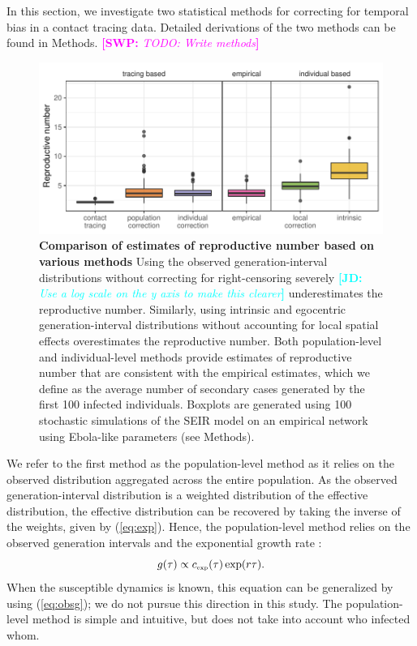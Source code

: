 \documentclass[12pt]{article}
\newcommand{\eref}[1]{(\ref{eq:#1})}
\newcommand{\tsub}[2]{#1_{{\textrm{\tiny #2}}}}
\newcommand{\comment}[3]{\textcolor{#1}{\textbf{[#2: }\textsl{#3}\textbf{]}}}
\newcommand{\jd}[1]{\comment{cyan}{JD}{#1}}
\newcommand{\swp}[1]{\comment{magenta}{SWP}{#1}}
\begin{document}
In this section, we investigate two statistical methods for correcting for temporal bias in a contact tracing data.
Detailed derivations of the two methods can be found in Methods.
\swp{TODO: Write methods}


\begin{figure}[ht]
\includegraphics[width=\textwidth]{../fig/cmp_reproductive.pdf}
\caption{\textbf{Comparison of estimates of reproductive number based on various methods}
Using the observed generation-interval distributions without correcting for right-censoring severely \jd{Use a log scale on the y axis to make this clearer} underestimates the reproductive number.
Similarly, using intrinsic and egocentric generation-interval distributions without accounting for local spatial effects overestimates the reproductive number.
Both population-level and individual-level methods provide estimates of reproductive number that are consistent with the empirical estimates, which we define as the average number of secondary cases generated by the first 100 infected individuals.
Boxplots are generated using 100 stochastic simulations of the SEIR model on an empirical network using Ebola-like parameters (see Methods).
}
\label{fig:cmp}
\end{figure}

We refer to the first method as the population-level method as it relies on the observed distribution aggregated across the entire population.
As the observed generation-interval distribution is a weighted distribution of the effective distribution, the effective distribution can be recovered by taking the inverse of the weights, given by \eref{exp}.
Hence, the population-level method relies on the observed generation intervals and the exponential growth rate \citep{tomba2010some, nishiura2010time}:
\begin{equation}
g(\tau) \propto \tsub{c}{exp}(\tau) \exp(r\tau).
\end{equation}
When the susceptible dynamics is known, this equation can be generalized by using \eref{obsg}; we do not pursue this direction in this study.
The population-level method is simple and intuitive, but does not take into account who infected whom.
\end{document}
